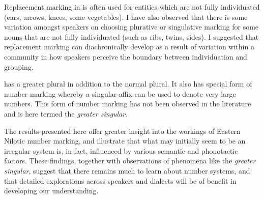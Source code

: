 \documentclass[output=paper]{langsci/langscibook}
\begin{document}
Replacement marking in  is often used for entities which are not fully individuated (ears, arrows, knees, some vegetables). I have also observed that there is some variation amongst speakers on choosing plurative or singulative marking for some nouns that are not fully individuated (such as ribs, twins, sides). I suggested that replacement marking can diachronically develop as a result of variation within a community in how speakers perceive the boundary between individuation and grouping.

 has a greater plural in addition to the normal plural. It also has special form of number marking whereby a singular affix can be used to denote very large numbers. This form of number marking has not been observed in the literature and is here termed the \textit{greater singular}.

The results presented here offer greater insight into the workings of Eastern Nilotic number marking, and illustrate that what may initially seem to be an irregular system is, in fact, influenced by various semantic and phonotactic factors. These findings, together with observations of phenomena like the \textit{greater singular}, suggest that there remains much to learn about  number systems, and that detailed explorations across speakers and dialects will be of benefit in developing our understanding. 
\end{document}
